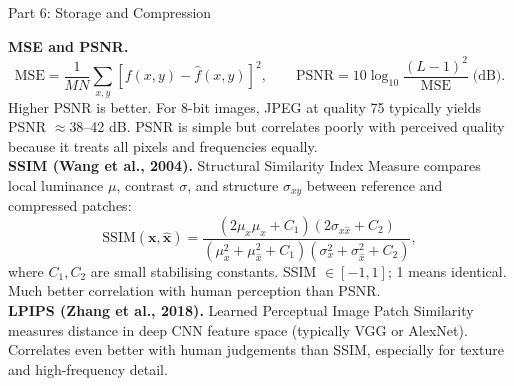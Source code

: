 \documentclass[letterpaper]{article}
\begin{document}
\begin{notes}{Part 6: Storage and Compression}

\textbf{MSE and PSNR.}
$$\mathrm{MSE} = \frac{1}{MN}\sum_{x,y}[f(x,y)-\hat{f}(x,y)]^2, \qquad \mathrm{PSNR} = 10\log_{10}\frac{(L-1)^2}{\mathrm{MSE}}\;\text{(dB)}.$$
Higher PSNR is better. For 8-bit images, JPEG at quality 75 typically yields PSNR $\approx 38$--42 dB. PSNR is simple but correlates poorly with perceived quality because it treats all pixels and frequencies equally.\\

\textbf{SSIM (Wang et al., 2004).} Structural Similarity Index Measure compares local luminance $\mu$, contrast $\sigma$, and structure $\sigma_{xy}$ between reference and compressed patches:
$$\mathrm{SSIM}(\mathbf{x},\hat{\mathbf{x}}) = \frac{(2\mu_x\mu_{\hat{x}}+C_1)(2\sigma_{x\hat{x}}+C_2)}{(\mu_x^2+\mu_{\hat{x}}^2+C_1)(\sigma_x^2+\sigma_{\hat{x}}^2+C_2)},$$
where $C_1, C_2$ are small stabilising constants. SSIM $\in [-1,1]$; 1 means identical. Much better correlation with human perception than PSNR.\\

\textbf{LPIPS (Zhang et al., 2018).} Learned Perceptual Image Patch Similarity measures distance in deep CNN feature space (typically VGG or AlexNet). Correlates even better with human judgements than SSIM, especially for texture and high-frequency detail.


\end{notes}
\end{document}
